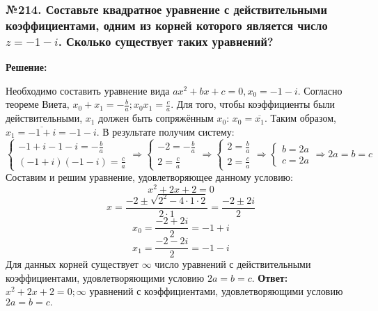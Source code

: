 \documentclass[a4paper]{article}
\begin{document}
\subsubsection*{№214. Составьте квадратное уравнение с действительными коэффициентами, одним из корней которого является число $z=-1-i$. Сколько существует таких уравнений?}
\textbf{Решение:} \par
Необходимо составить уравнение вида $ax^2+bx+c=0, x_0=-1-i$. \newline
Согласно теореме Виета, $x_0+x_1=-\frac{b}{a}; x_0x_1=\frac{c}{a}$. \newline
Для того, чтобы коэффициенты были действительными, $x_1$ должен быть сопряжённым $x_0$: $x_0=\overline{x_1}$. \newline
Таким образом, $x_1=\overline{-1+i}=-1-i$. \newline
В результате получим систему:
\begin{equation*}
 \begin{cases}
	-1+i-1-i=-\frac{b}{a} \\
	(-1+i)(-1-i)=\frac{c}{a}
 \end{cases}
\Rightarrow
 \begin{cases}
	-2=-\frac{b}{a} \\
	2=\frac{c}{a}
 \end{cases}
\Rightarrow
 \begin{cases}
	2=\frac{b}{a} \\
	2=\frac{c}{a}
 \end{cases}
\Rightarrow
 \begin{cases}
	b=2a \\
	c=2a
 \end{cases}
\Rightarrow
2a=b=c
\end{equation*}
Составим и решим уравнение, удовлетворяющее данному условию:
\[x^2+2x+2=0\]
\[x=\frac{-2\pm\sqrt{2^2-4\cdot1\cdot2}}{2\cdot1}=\frac{-2\pm2i}{2}\]
\[x_0=\frac{-2+2i}{2}=-1+i\]
\[x_1=\frac{-2-2i}{2}=-1-i\]
Для данных корней существует $\infty$ число уравнений с действительными коэффициентами, удовлетворяющими условию $2a=b=c$.\newline
\textbf{Ответ:} $x^2+2x+2=0; \infty$ уравнений с коэффициентами, удовлетворяющими условию $2a=b=c.$
\end{document}
